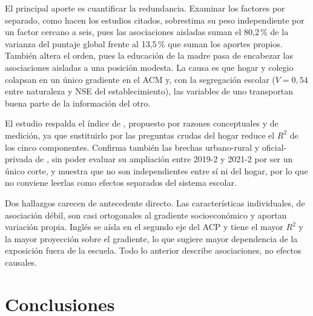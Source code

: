 \documentclass[12pt]{article}
\begin{document}
El principal aporte es cuantificar la redundancia. Examinar los factores por separado, como hacen
los estudios citados, sobrestima su peso independiente por un factor cercano a seis, pues las
asociaciones aisladas suman el 80,2\,\% de la varianza del puntaje global frente al 13,5\,\% que
suman los aportes propios. También altera el orden, pues la educación de la madre pasa de
encabezar las asociaciones aisladas a una posición modesta. La causa es que hogar y colegio colapsan en un único gradiente en el ACM y, con la
segregación escolar ($V = 0{,}54$ entre naturaleza y NSE del establecimiento), las variables de uno
transportan buena parte de la información del otro.

El estudio respalda el índice de \textcite{cruz2016}, propuesto por razones conceptuales y de
medición, ya que sustituirlo por las preguntas crudas del hogar reduce el $R^2$ de los cinco
componentes. Confirma también las brechas urbano-rural y oficial-privada de \textcite{quintero2025},
sin poder evaluar su ampliación entre 2019-2 y 2021-2 por ser un único corte, y muestra que no son
independientes entre sí ni del hogar, por lo que no conviene leerlas como efectos separados del
sistema escolar.

Dos hallazgos carecen de antecedente directo. Las características individuales, de asociación
débil, son casi ortogonales al gradiente socioeconómico y aportan variación propia. Inglés se aísla
en el segundo eje del ACP y tiene el mayor $R^2$ y la mayor proyección sobre el gradiente, lo que
sugiere mayor dependencia de la exposición fuera de la escuela. Todo lo anterior describe
asociaciones, no efectos causales.

\vspace{0.1cm}

\section{Conclusiones}
\label{sec:conclusiones}
\end{document}
